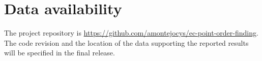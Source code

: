 \section{Data availability}

\begin{revision}
The project repository is \url{https://github.com/amontejocys/ec-point-order-finding}. The code revision and the location of the data supporting the reported results will be specified in the final release.
\end{revision}